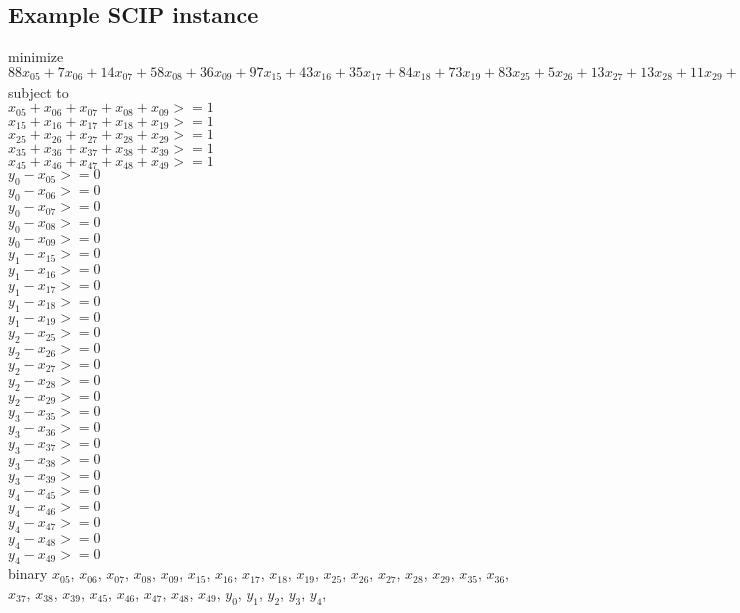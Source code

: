 \documentclass[12pt]{report}
\begin{document}
\subsection*{Example SCIP instance}
minimize
  $88x_{05} + 7x_{06} + 14x_{07} + 58x_{08} + 36x_{09} + 97x_{15} + 43x_{16} + 35x_{17} + 84x_{18} + 73x_{19} + 83x_{25} + 5x_{26} + 13x_{27} + 13x_{28} + 11x_{29} + 21x_{35} + 77x_{36} + 64x_{37} + 12x_{38} + 50x_{39} + 28x_{45} + 49x_{46} + 9x_{47} + 34x_{48} + 18x_{49} + 46y_0 + 15y_1 + 44y_2 + 46y_3 + 56y_4 $\\
subject to\\
$x_{05} +x_{06} +x_{07} +x_{08} +x_{09}  >= 1$\\
$x_{15} +x_{16} +x_{17} +x_{18} +x_{19}  >= 1$\\
$x_{25} +x_{26} +x_{27} +x_{28} +x_{29}  >= 1$\\
$x_{35} +x_{36} +x_{37} +x_{38} +x_{39}  >= 1$\\
$x_{45} +x_{46} +x_{47} +x_{48} +x_{49}  >= 1$\\
$y_0 - x_{05} >= 0$\\
$y_0 - x_{06} >= 0$\\
$y_0 - x_{07} >= 0$\\
$y_0 - x_{08} >= 0$\\
$y_0 - x_{09} >= 0$\\
$y_1 - x_{15} >= 0$\\
$y_1 - x_{16} >= 0$\\
$y_1 - x_{17} >= 0$\\
$y_1 - x_{18} >= 0$\\
$y_1 - x_{19} >= 0$\\
$y_2 - x_{25} >= 0$\\
$y_2 - x_{26} >= 0$\\
$y_2 - x_{27} >= 0$\\
$y_2 - x_{28} >= 0$\\
$y_2 - x_{29} >= 0$\\
$y_3 - x_{35} >= 0$\\
$y_3 - x_{36} >= 0$\\
$y_3 - x_{37} >= 0$\\
$y_3 - x_{38} >= 0$\\
$y_3 - x_{39} >= 0$\\
$y_4 - x_{45} >= 0$\\
$y_4 - x_{46} >= 0$\\
$y_4 - x_{47} >= 0$\\
$y_4 - x_{48} >= 0$\\
$y_4 - x_{49} >= 0$\\
binary
$x_{05}$, $x_{06}$, $x_{07}$, $x_{08}$, $x_{09}$, $x_{15}$, $x_{16}$, $x_{17}$, $x_{18}$, $x_{19}$, $x_{25}$, $x_{26}$, $x_{27}$, $x_{28}$, $x_{29}$, $x_{35}$, $x_{36}$, $x_{37}$, $x_{38}$, $x_{39}$, $x_{45}$, $x_{46}$, $x_{47}$, $x_{48}$, $x_{49}$, $y_0$, $y_1$, $y_2$, $y_3$, $y_4$, 
\end{document}
